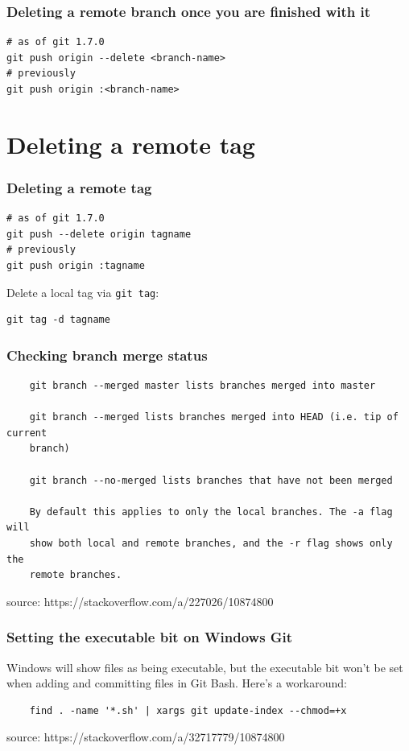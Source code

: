 \documentclass{git_course}
\begin{document}
\begin{frame}[fragile]
    \frametitle{Deleting a remote branch once you are finished with it}

\begin{lstlisting}
# as of git 1.7.0
git push origin --delete <branch-name>
# previously
git push origin :<branch-name>
\end{lstlisting}
\end{frame}

\section{Deleting a remote tag}

\begin{frame}[fragile]
\frametitle{Deleting a remote tag}

\begin{lstlisting}
# as of git 1.7.0
git push --delete origin tagname
# previously
git push origin :tagname
\end{lstlisting}

Delete a local tag via \texttt{git tag}:
\begin{lstlisting}
git tag -d tagname
\end{lstlisting}
\end{frame}


\begin{frame}[fragile]
\frametitle{Checking branch merge status}
    \begin{lstlisting}
    git branch --merged master lists branches merged into master

    git branch --merged lists branches merged into HEAD (i.e. tip of current
    branch)

    git branch --no-merged lists branches that have not been merged

    By default this applies to only the local branches. The -a flag will
    show both local and remote branches, and the -r flag shows only the
    remote branches.
    \end{lstlisting}
    source: https://stackoverflow.com/a/227026/10874800
\end{frame}

\begin{frame}[fragile]
\frametitle{Setting the executable bit on Windows Git}
Windows will show files as being executable, but the executable bit won't be
set when adding and committing files in Git Bash.  Here's a workaround:
    \begin{lstlisting}
    find . -name '*.sh' | xargs git update-index --chmod=+x
    \end{lstlisting}
    source: https://stackoverflow.com/a/32717779/10874800
\end{frame}
\end{document}

